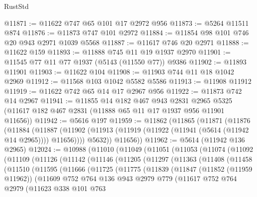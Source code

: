 \begin{lexlean}{RustStd}
\begin{coremodule}
@11871 := @11622 @747 @65 @101 @17 @2972 @956
@11873 := @5264 @11511 @874
@11876 := @11873 @747 @101 @2972
@11884 := @11854 @98 @101 @746 @20 @943 @2971 @1039 @5568
@11887 := @11617 @746 @20 @2971
@11888 := @11622 @159
@11893 := @11888 @745 @11 @19 @1937 @2970
@11901 := @11545 @77 @11 @77 @1937 (@5143 (@11550 @77)) @9386
@11902 := @11893 @11901
@11903 := @11622 @104
@11908 := @11903 @744 @11 @18 @1042 @2969
@11912 := @11568 @103 @1042 @5582 @5586
@11913 := @11908 @11912
@11919 := @11622 @742 @65 @14 @17 @2967 @956
@11922 := @11873 @742 @14 @2967
@11941 := @11855
    @14
    @182
    @467
    @943
    @2831
    @2965
    @5325
    (@11617 @182 @467 @2831 (@11888 @65 @11 @17 @1937 @956 @11901 @11656))
@11942 := @5616 @197
@11959 := @11862
    (@11865
      (@11871
        (@11876
          (@11884
            (@11887 (@11902 (@11913 (@11919 (@11922 (@11941 (@5614 (@11942 @14 @2965)))) @11656))))
            @5632))
        @11656))
@11962 := @5614 (@11942 @136 @2965)
@12024 := @10988
    (@11010
      (@11049
        (@11051
          (@11053
            (@11074
              (@11092
                (@11109
                  (@11126
                    (@11142
                      (@11146
                        (@11205
                          (@11297
                            (@11363
                              (@11408
                                (@11458
                                  (@11510
                                    (@11595
                                      (@11666
                                        (@11725
                                          (@11775
                                            (@11839
                                              (@11847
                                                (@11852 (@11959 @11962))
                                                (@11609
                                                  @752
                                                  @764
                                                  @136
                                                  @943
                                                  @2979
                                                  @779
                                                  (@11617
                                                    @752
                                                    @764
                                                    @2979
                                                    (@11623
                                                      @338
                                                      @101
                                                      @763

\end{coremodule}
\end{lexlean}
